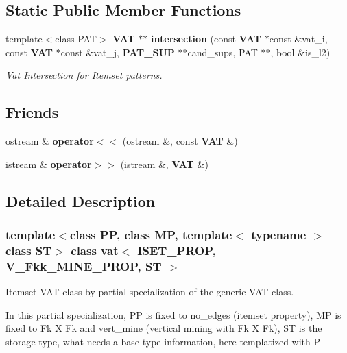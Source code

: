 \subsection*{Static Public Member Functions}
\begin{CompactItemize}
\item 
template$<$class PAT$>$ {\bf VAT} $\ast$$\ast$ {\bf intersection} (const  {\bf VAT} $\ast$const \&vat\_\-i, const  {\bf VAT} $\ast$const \&vat\_\-j, {\bf PAT\_\-SUP} $\ast$$\ast$cand\_\-sups, PAT $\ast$$\ast$, bool \&is\_\-l2)
\begin{CompactList}\small\item\em Vat Intersection for Itemset patterns. \item\end{CompactList}\end{CompactItemize}
\subsection*{Friends}
\begin{CompactItemize}
\item 
ostream \& {\bf operator$<$$<$} (ostream \&, const  {\bf VAT} \&)\label{classvat_3_01ISET__PROP_00_01V__Fkk__MINE__PROP_00_01ST_01_4_n0}

\item 
istream \& {\bf operator$>$$>$} (istream \&, {\bf VAT} \&)\label{classvat_3_01ISET__PROP_00_01V__Fkk__MINE__PROP_00_01ST_01_4_n1}

\end{CompactItemize}


\subsection{Detailed Description}
\subsubsection*{template$<$class PP, class MP, template$<$ typename $>$ class ST$>$ class vat$<$ ISET\_\-PROP, V\_\-Fkk\_\-MINE\_\-PROP, ST $>$}

Itemset VAT class by partial specialization of the generic VAT class. 

In this partial specialization, PP is fixed to no\_\-edges (itemset property), MP is fixed to Fk X Fk and vert\_\-mine (vertical mining with Fk X Fk), ST is the storage type, what needs a base type information, here templatized with P 



